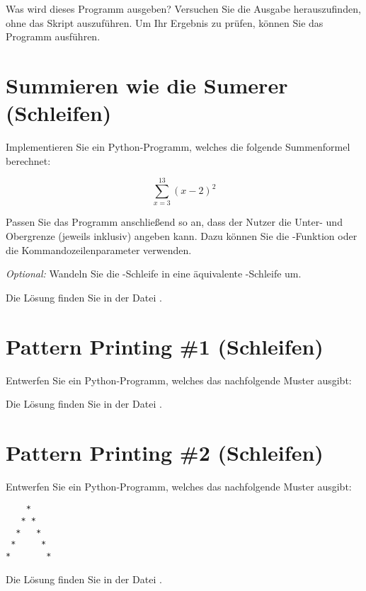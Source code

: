 Was wird dieses Programm ausgeben? Versuchen Sie die Ausgabe herauszufinden, ohne das Skript auszuführen. Um Ihr Ergebnis zu prüfen, können Sie das Programm  ausführen.


\section{Summieren wie die Sumerer \small{(Schleifen)}}

Implementieren Sie ein Python-Programm, welches die folgende Summenformel berechnet:

$$\sum_{x=3}^{13}(x-2)^2$$

Passen Sie das Programm anschließend so an, dass der Nutzer die Unter- und Obergrenze (jeweils inklusiv) angeben kann. Dazu können Sie die -Funktion oder die Kommandozeilenparameter verwenden. 

\textit{Optional:} Wandeln Sie die -Schleife in eine äquivalente -Schleife um.

Die Lösung finden Sie in der Datei .


\section{Pattern Printing \#1 \small{(Schleifen)}}

Entwerfen Sie ein Python-Programm, welches das nachfolgende Muster ausgibt: 


Die Lösung finden Sie in der Datei .


\section{Pattern Printing \#2 \small{(Schleifen)}}

Entwerfen Sie ein Python-Programm, welches das nachfolgende Muster ausgibt: 

\begin{lstlisting}
    *
   * *
  *   *
 *     *
*       *
\end{lstlisting}

Die Lösung finden Sie in der Datei .

